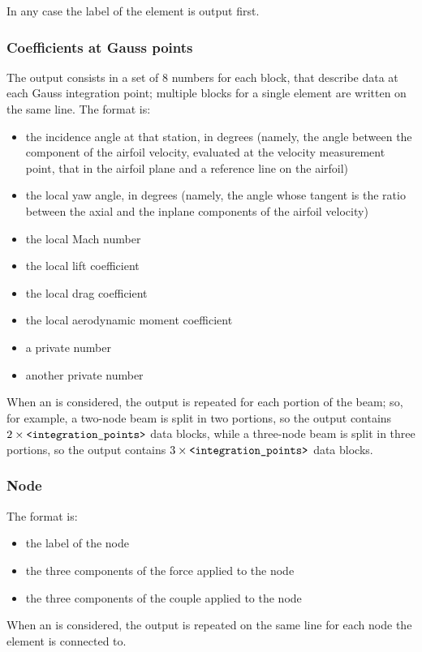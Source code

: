 \noindent
In any case the label of the element is output first.

\subsubsection{Coefficients at Gauss points}
The output consists in a set of 8 numbers for each block,
that describe data at each Gauss integration point;
multiple blocks for a single element are written on the same line.
The format is:
\begin{itemize}
    \item the incidence angle at that station, in degrees 
	(namely, the angle between the component of the airfoil velocity,
	evaluated at the velocity measurement point, that in the airfoil
	plane and a reference line on the airfoil)
    \item the local yaw angle, in degrees
	(namely, the angle whose tangent is the ratio
	between the axial and the inplane components of the airfoil
	velocity)
    \item the local Mach number
    \item the local lift coefficient
    \item the local drag coefficient
    \item the local aerodynamic moment coefficient
    \item a private number
    \item another private number
\end{itemize}
When an  is considered, the output 
is repeated for each portion of the beam; so, for example,
a two-node beam is split in two portions, so the output
contains $2\times \texttt{<integration\_points>}$ data blocks,
while a three-node beam is split in three portions,
so the output contains $3\times \texttt{<integration\_points>}$ data blocks.

\subsubsection{Node}
The format is:
\begin{itemize}
    \item the label of the node
    \item the three components of the force applied to the node
    \item the three components of the couple applied to the node
\end{itemize}
When an  is considered, the output is repeated 
on the same line for each node the element is connected to.

